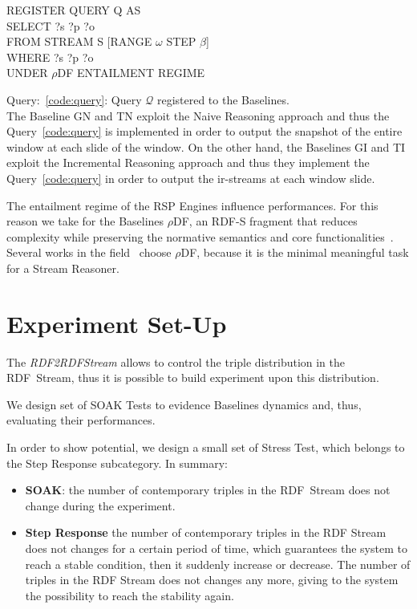 \begin{center}
\raggedright
\small
REGISTER QUERY Q AS \\
SELECT ?s ?p ?o \\
FROM STREAM S [RANGE $\omega$ STEP $\beta$]\\
WHERE {?s ?p ?o}\\
UNDER $\rho$DF ENTAILMENT REGIME
\label{code:query}

\end{center}
Query:~\ref{code:query}: Query $\mathcal{Q}$ registered to the \name Baselines.\\


The Baseline GN and TN exploit the Naive Reasoning approach and thus the Query~\ref{code:query} is implemented in order to output the snapshot of the entire window at each slide of the window. On the other hand, the Baselines GI and TI exploit the Incremental Reasoning approach and thus they implement the Query~\ref{code:query} in order to output the ir-streams at each window slide.

The entailment regime of the RSP Engines influence performances. For this reason we take for the Baselines $\rho$DF, an RDF-S fragment that reduces complexity while preserving the normative semantics and core functionalities~\cite{DBLP:conf/esws/MunozPG07}. Several works in the field~\cite{DBLP:conf/semweb/UrbaniMJHB13, Liu:2014:ERS:2567948.2577323} choose $\rho$DF, because it is the minimal meaningful task for a Stream Reasoner.

\section{Experiment Set-Up}\label{sec:experiment-setup}

The \textit{RDF2RDFStream} allows to control the triple distribution in the RDF~Stream, thus it is possible to build experiment upon this distribution. 

We design set of SOAK Tests to evidence Baselines dynamics and, thus, evaluating their performances. 

In order to show \name potential, we design a small set of Stress Test, which belongs to the Step Response subcategory. In summary:

\begin{itemize}
\item \textbf{SOAK}: the number of contemporary triples in the RDF~Stream does not change during the experiment.
\item \textbf{Step Response} the number of contemporary triples in the RDF Stream does not changes for a certain period of time, which guarantees the system to reach a stable condition, then it suddenly increase or decrease. The number of triples in the RDF Stream does not changes any more, giving to the system the possibility to reach the stability again.
\end{itemize}

